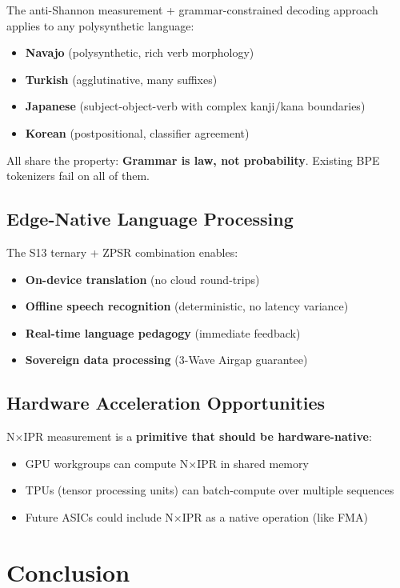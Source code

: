 \documentclass[11pt,oneside]{article}
\begin{document}
The anti-Shannon measurement + grammar-constrained decoding approach applies to any polysynthetic language:

\begin{itemize}
  \item \textbf{Navajo} (polysynthetic, rich verb morphology)
  \item \textbf{Turkish} (agglutinative, many suffixes)
  \item \textbf{Japanese} (subject-object-verb with complex kanji/kana boundaries)
  \item \textbf{Korean} (postpositional, classifier agreement)
\end{itemize}

All share the property: \textbf{Grammar is law, not probability}. Existing BPE tokenizers fail on all of them.

\subsection{Edge-Native Language Processing}

The S13 ternary + ZPSR combination enables:
\begin{itemize}
  \item \textbf{On-device translation} (no cloud round-trips)
  \item \textbf{Offline speech recognition} (deterministic, no latency variance)
  \item \textbf{Real-time language pedagogy} (immediate feedback)
  \item \textbf{Sovereign data processing} (3-Wave Airgap guarantee)
\end{itemize}

\subsection{Hardware Acceleration Opportunities}

N×IPR measurement is a \textbf{primitive that should be hardware-native}:
\begin{itemize}
  \item GPU workgroups can compute N×IPR in shared memory
  \item TPUs (tensor processing units) can batch-compute over multiple sequences
  \item Future ASICs could include N×IPR as a native operation (like FMA)
\end{itemize}

\section*{Conclusion}
\end{document}
